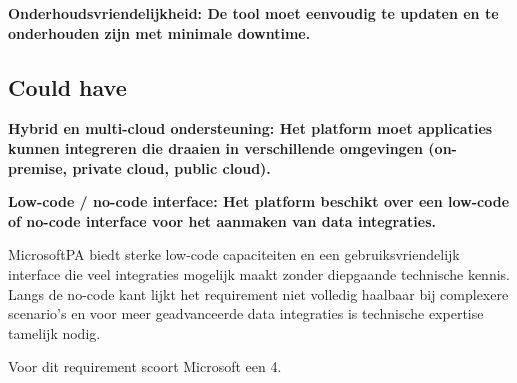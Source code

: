 \vspace{\baselineskip}



\vspace{\baselineskip}

\textbf{Onderhoudsvriendelijkheid: De tool moet eenvoudig te updaten en te onderhouden zijn met minimale downtime.}

\vspace{\baselineskip}



\vspace{\baselineskip}

\subsection{Could have}%
\label{CouldHaveMicrosoft}

\textbf{Hybrid en multi-cloud ondersteuning: Het platform moet applicaties kunnen integreren die draaien in verschillende omgevingen (on-premise, private cloud, public cloud).}

\vspace{\baselineskip}



\vspace{\baselineskip}

\textbf{Low-code / no-code interface: Het platform beschikt over een low-code of no-code interface voor het aanmaken van data integraties.}

\vspace{\baselineskip}

MicrosoftPA biedt sterke low-code capaciteiten en een gebruiksvriendelijk interface die veel integraties mogelijk maakt zonder diepgaande technische kennis. Langs de no-code kant lijkt het requirement niet volledig haalbaar bij complexere scenario's en voor meer geadvanceerde data integraties is technische expertise tamelijk nodig.

Voor dit requirement scoort Microsoft een 4.

\newpage

